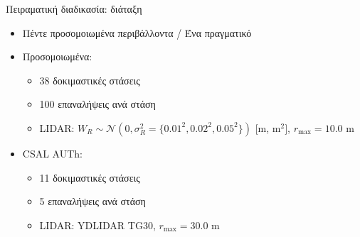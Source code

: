 \begin{frame}{Πειραματική διαδικασία: διάταξη}

  \begin{itemize}
    \item Πέντε προσομοιωμένα περιβάλλοντα / Ένα πραγματικό
    \item Προσομοιωμένα:
      \begin{itemize}
        \item 38 δοκιμαστικές στάσεις
        \item 100 επαναλήψεις ανά στάση
        \item LIDAR: $W_R \sim \mathcal{N}(0,\sigma_R^2 = \{0.01^2, 0.02^2, 0.05^2\})$ {\footnotesize $[$m, m$^2]$}, $r_{\max} = 10.0$ m
      \end{itemize}
    \item CSAL AUTh:
      \begin{itemize}
        \item 11 δοκιμαστικές στάσεις
        \item 5 επαναλήψεις ανά στάση
        \item LIDAR: YDLIDAR TG30, $r_{\max} = 30.0$ m \\


\end{itemize}
\end{itemize}
\end{frame}
